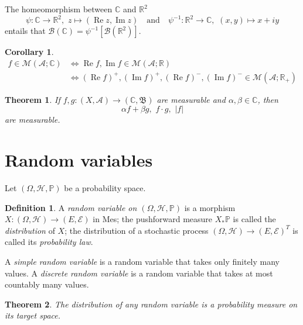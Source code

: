\documentclass[11pt, a4paper, openany]{book}
\newtheorem{thm}{Theorem}\newtheorem{lem}{Lemma}\newtheorem{crl}{Corollary}
\theoremstyle{definition}
\newtheorem{define}{Definition}\newtheorem{exam}{Example}\newtheorem{remark}{Remark}
\DeclareMathOperator{\RE}{Re}
\DeclareMathOperator{\IM}{Im}
\newcommand{\cat}[1]{\textup{\textsf{#1}}}
\begin{document}
    The homeomorphism between $\mathbb{C}$ and $\mathbb{R}^2$
    \[\psi:\mathbb{C}\rightarrow \mathbb{R}^2,\,\,z\mapsto (\RE{z},\IM{z})\quad\text{and}\quad\psi^{-1}:\mathbb{R}^2\rightarrow \mathbb{C},\,\,(x,y)\mapsto x+iy\]
    entails that $\mathscr{B}(\mathbb{C})=\psi^{-1}[\mathscr{B}(\mathbb{R}^2)]$.%
    \begin{crl}
        \begin{align*}
            f\in\mathcal{M}(\mathscr{A};\mathbb{C})&\Longleftrightarrow \RE{f},\IM{f}\in\mathcal{M}(\mathscr{A};\mathbb{R})\\
            &\Longleftrightarrow (\RE{f})^+,(\IM{f})^+,(\RE{f})^-,(\IM{f})^-\in\mathcal{M}(\mathscr{A};\mathbb{R}_+)
        \end{align*}
    \end{crl}
    \begin{thm}
        If $f,g:(X,\mathscr{A})\rightarrow (\mathbb{C},\mathfrak{B})$ are measurable and $\alpha,\beta\in\mathbb{C}$, then
        \[
            \alpha f+\beta g,\,\,f\cdot g,\,\,|f| 
        \]
        are measurable.
    \end{thm}
\section{Random variables}
    Let $(\Omega,\mathscr{H},\mathbb{P})$ be a probability space.
    \begin{define}
        A \textit{random variable on $(\Omega,\mathscr{H},\mathbb{P})$} is a morphism $X:(\Omega,\mathscr{H})\rightarrow (E,\mathscr{E})$ in \cat{Mes}; the pushforward measure $X_*\mathbb{P}$ is called the \textit{distribution} of $X$; the distribution of a stochastic process $(\Omega,\mathscr{H})\rightarrow (E,\mathscr{E})^T$ is called its \textit{probability law}.

        A \textit{simple random variable} is a random variable that takes only finitely many values. A \textit{discrete random variable} is a random variable that takes at most countably many values.
    \end{define}
    \begin{thm}
        The distribution of any random variable is a probability measure on its target space.
    \end{thm}
\end{document}
